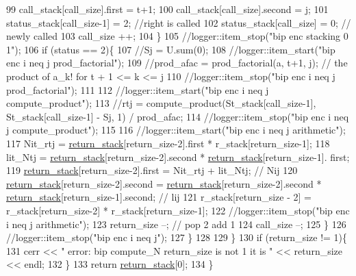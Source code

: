 \begin{DoxyCode}
99         call\_stack[call\_size].first = t+1;
100         call\_stack[call\_size].second = j;
101         status\_stack[call\_size-1] = 2; \textcolor{comment}{//right is called}
102         status\_stack[call\_size] = 0;  \textcolor{comment}{// newly called}
103         call\_size ++;
104       \}
105       \textcolor{comment}{//logger::item\_stop("bip enc stacking 0 1");}
106       \textcolor{keywordflow}{if} (status == 2)\{
107         \textcolor{comment}{//Sj = U.sum(0);}
108         \textcolor{comment}{//logger::item\_start("bip enc i neq j prod\_factorial");}
109         \textcolor{comment}{//prod\_afac = prod\_factorial(a, t+1, j); // the product of a\_k! for t + 1 <= k <= j}
110         \textcolor{comment}{//logger::item\_stop("bip enc i neq j prod\_factorial");}
111 
112         \textcolor{comment}{//logger::item\_start("bip enc i neq j compute\_product");}
113         \textcolor{comment}{//rtj = compute\_product(St\_stack[call\_size-1], St\_stack[call\_size-1] - Sj, 1) / prod\_afac;}
114         \textcolor{comment}{//logger::item\_stop("bip enc i neq j compute\_product");}
115 
116         \textcolor{comment}{//logger::item\_start("bip enc i neq j arithmetic");}
117         Nit\_rtj = \hyperlink{namespacehelper__vars_a6d2100c373830cacd232319a9958652d}{return\_stack}[return\_size-2].first * r\_stack[return\_size-1]; 
118         lit\_Ntj = \hyperlink{namespacehelper__vars_a6d2100c373830cacd232319a9958652d}{return\_stack}[return\_size-2].second * \hyperlink{namespacehelper__vars_a6d2100c373830cacd232319a9958652d}{return\_stack}[return\_size-1].
      first;
119         \hyperlink{namespacehelper__vars_a6d2100c373830cacd232319a9958652d}{return\_stack}[return\_size-2].first = Nit\_rtj + lit\_Ntj; \textcolor{comment}{// Nij}
120         \hyperlink{namespacehelper__vars_a6d2100c373830cacd232319a9958652d}{return\_stack}[return\_size-2].second = \hyperlink{namespacehelper__vars_a6d2100c373830cacd232319a9958652d}{return\_stack}[return\_size-2].second * 
      \hyperlink{namespacehelper__vars_a6d2100c373830cacd232319a9958652d}{return\_stack}[return\_size-1].second; \textcolor{comment}{// lij}
121         r\_stack[return\_size - 2] = r\_stack[return\_size-2] * r\_stack[return\_size-1];
122         \textcolor{comment}{//logger::item\_stop("bip enc i neq j arithmetic");}
123         return\_size --; \textcolor{comment}{// pop 2 add 1}
124         call\_size --;
125       \}
126       \textcolor{comment}{//logger::item\_stop("bip enc i neq j");}
127     \}
128 
129   \}
130   \textcolor{keywordflow}{if} (return\_size != 1)\{
131     cerr << \textcolor{stringliteral}{" error: bip compute\_N return\_size is not 1 it is "} << return\_size << endl;
132   \}
133   \textcolor{keywordflow}{return} \hyperlink{namespacehelper__vars_a6d2100c373830cacd232319a9958652d}{return\_stack}[0];
134 \}
\end{DoxyCode}
\mbox{\label{classb__graph__encoder_a9dbf40f42a2eb12822b14ca10d580763}} 
